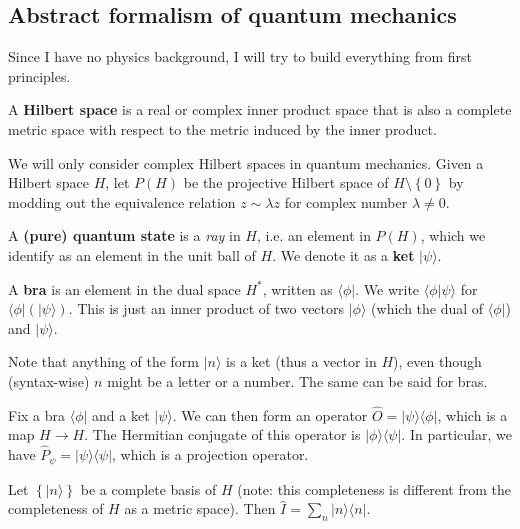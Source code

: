 

\subsection{Abstract formalism of quantum mechanics}

Since I have no physics background, I will try to build everything from first principles.

\begin{definition}
  A \textbf{Hilbert space} is a real or complex inner product space that is also a complete metric space with respect to the metric induced by the inner product.
\end{definition}


We will only consider complex Hilbert spaces in quantum mechanics. Given a Hilbert space $H$, let $P(H)$ be the projective Hilbert space of $H \setminus \left\{ 0 \right\} $ by modding out the equivalence relation $z \sim \lambda z$ for complex number $\lambda \neq 0$.     

\begin{definition}
  A \textbf{(pure) quantum state} is a \textit{ray} in $H$, i.e. an element in $P(H)$, which we identify as an element  in the unit ball of $H$. We denote it as a \textbf{ket} $| \psi \rangle$.  
\end{definition}



\begin{definition}
  A \textbf{bra} is an element in the dual space $H^*$, written as $\langle \phi |$. We write $\langle \phi | \psi  \rangle$  for $\langle \phi | (| \psi \rangle)$. This is just an inner product of two vectors $| \phi \rangle$ (which the dual of $\langle \phi |$) and $| \psi \rangle$.  
\end{definition}


Note that anything of the form $| n \rangle$ is a ket (thus a vector in $H$), even though (syntax-wise) $n$ might be a letter or a number. The same can be said for bras.


Fix a bra $\langle \phi |$ and a ket $| \psi \rangle$. We can then form an operator $\hat{O} = | \psi \rangle \langle \phi |$, which is a map $H \to H$. The Hermitian conjugate of this operator is $| \phi \rangle \langle \psi |$. In particular, we have $\hat{P}_{\psi} = |  \psi \rangle \langle \psi |$, which is a projection operator.  


Let $\left\{ | n \rangle \right\} $  be a complete basis of $H$ (note: this completeness is different from the completeness of $H$ as a metric space).  Then $\hat{I} = \sum_{ n} | n \rangle \langle n |$. 


